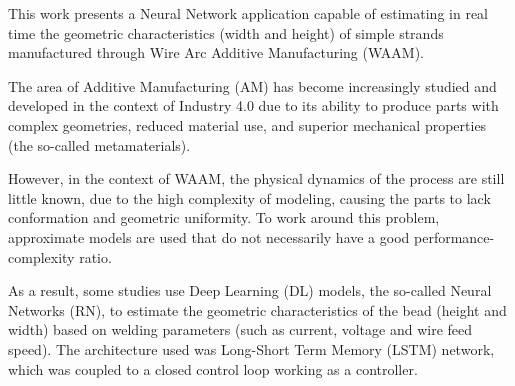 \begin{foreignabstract}
This work presents a Neural Network application capable of estimating in real time the geometric characteristics (width and height) of simple strands manufactured through Wire Arc Additive Manufacturing (WAAM).

The area of Additive Manufacturing (AM) has become increasingly studied and developed in the context of Industry 4.0 due to its ability to produce parts with complex geometries, reduced material use, and superior mechanical properties (the so-called metamaterials).

However, in the context of WAAM, the physical dynamics of the process are still little known, due to the high complexity of modeling, causing the parts to lack conformation and geometric uniformity. To work around this problem, approximate models are used that do not necessarily have a good performance-complexity ratio.

As a result, some studies use Deep Learning (DL) models, the so-called Neural Networks (RN), to estimate the geometric characteristics of the bead (height and width) based on welding parameters (such as current, voltage and wire feed speed). The architecture used was Long-Short Term Memory (LSTM) network, which was coupled to a closed control loop working as a controller.
\end{foreignabstract}

